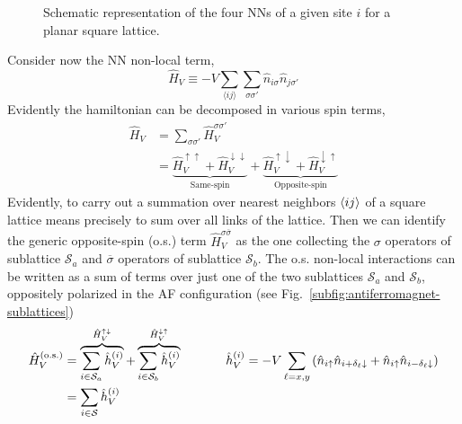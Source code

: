 \begin{figure}
	\centering
	
	\caption{Schematic representation of the four NNs of a given site $i$ for a planar square lattice.}
	\label{fig:square-nearest-neighbors}
\end{figure}

Consider now the NN non-local term,
\begin{equation}\label{eq:extended-hubbard-nonlocal-interaction}
	\hat H_V \equiv - V \sum_{\langle ij \rangle} \sum_{\sigma \sigma'} \hat n_{i\sigma} \hat n_{j\sigma'}
\end{equation}
Evidently the hamiltonian can be decomposed in various spin terms,
\[
\begin{aligned}
	\hat H_V &= \sum_{\sigma \sigma'} \hat H_V^{\sigma\sigma'} \\
	&= \underbrace{
		\hat H_V^{\uparrow\uparrow} + \hat H_V^{\downarrow\downarrow}
	}_\text{Same-spin} + \underbrace{
		\hat H_V^{\uparrow\downarrow} + \hat H_V^{\downarrow\uparrow}
	}_\text{Opposite-spin}
\end{aligned}
\]
Evidently, to carry out a summation over nearest neighbors $\ev{ij}$ of a square lattice means precisely to sum over all links of the lattice. Then we can identify the generic opposite-spin (o.s.) term $\hat H_V^{\sigma \overline{\sigma}}$ as the one collecting the $\sigma$ operators of sublattice $\mathcal{S}_a$ and $\overline{\sigma}$ operators of sublattice $\mathcal{S}_b$. 
The o.s. non-local interactions can be written as a sum of terms over just one of the two sublattices $\mathcal{S}_a$ and $\mathcal{S}_b$, oppositely polarized in the AF configuration (see Fig.~\ref{subfig:antiferromagnet-sublattices})
\[
	\begin{aligned}
		\hat H_V^{(\mathrm{o.s.})} &= \overbrace{
			\sum_{i \in \mathcal{S}_a} \hat h_V^{(i)}
		}^{\hat H_V^{\uparrow\downarrow}} + \overbrace{
			\sum_{i \in \mathcal{S}_b} \hat h_V^{(i)}
		}^{\hat H_V^{\downarrow\uparrow}} \hspace{0.1\textwidth}
		\hat h_V^{(i)} = -V \sum_{\ell = x,y} \left(
		\hat n_{i\uparrow} \hat n_{i+\delta_\ell \downarrow} + \hat n_{i\uparrow} \hat n_{i-\delta_\ell \downarrow} 
		\right)  \\
		&= \sum_{i \in \mathcal{S}} \hat h_V^{(i)}
	\end{aligned}
\]
